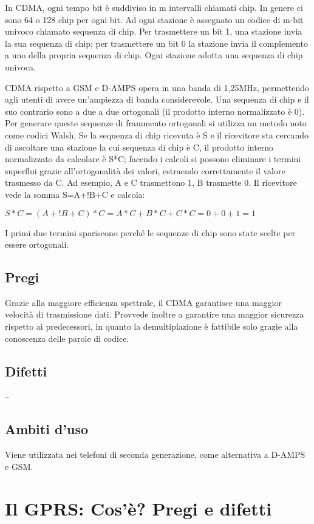In CDMA, ogni tempo bit è suddiviso in m intervalli chiamati chip. In genere ci sono 64 o 128 chip per ogni bit. Ad ogni stazione è assegnato un codice di m-bit univoco chiamato sequenza di chip.
Per trasmettere un bit 1, una stazione invia la sua sequenza di chip; per trasmettere un bit 0 la stazione invia il complemento a uno della propria sequenza di chip.
Ogni stazione adotta una sequenza di chip univoca.

CDMA rispetto a GSM e D-AMPS opera in una banda di 1,25MHz, permettendo agli utenti di avere un'ampiezza di banda considerevole.
Una sequenza di chip e il suo contrario sono a due a due ortogonali (il prodotto interno normalizzato è 0). Per generare queste sequenze di frammento ortogonali si utilizza un metodo noto come codici Walsh. 
Se la sequenza di chip ricevuta è S e il ricevitore sta cercando di ascoltare una stazione la cui sequenza di chip è C, il prodotto interno normalizzato da calcolare è S*C; facendo i calcoli si possono eliminare i termini superflui grazie all'ortogonalità dei valori, estraendo correttamente il valore trasmesso da C. 
Ad esempio, A e C trasmettono 1, B trasmette 0. Il ricevitore vede la somma S=A+!B+C e calcola:
\begin{center}
$S*C=(A+!B+C)*C=A*C+B*C+C*C=0+0+1=1$
\end{center}
I primi due termini spariscono perché le sequenze di chip sono state scelte per essere ortogonali.
\subsection{Pregi}
Grazie alla maggiore efficienza spettrale, il CDMA garantisce una maggior velocità di trasmissione dati.
Provvede inoltre a garantire una maggior sicurezza rispetto ai predecessori, in quanto la demultiplazione è fattibile solo grazie alla conoscenza delle parole di codice.
\subsection{Difetti}
--
\subsection{Ambiti d'uso}
Viene utilizzata nei telefoni di seconda generazione, come alternativa a D-AMPS e GSM.

\section{Il GPRS: Cos'è? Pregi e difetti}

